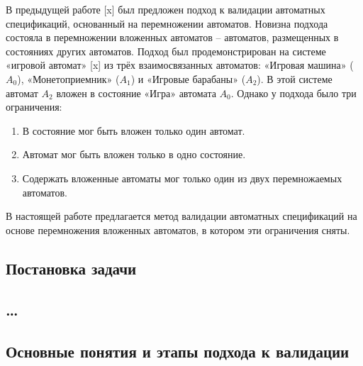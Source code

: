 \documentclass[12pt]{article}
\begin{document}
В предыдущей работе [x] был предложен подход к валидации автоматных спецификаций, основанный на перемножении автоматов. Новизна подхода состояла в перемножении вложенных автоматов – автоматов, размещенных в состояниях других автоматов. Подход был продемонстрирован на системе «игровой автомат» [x] из трёх взаимосвязанных автоматов: «Игровая машина» ($A_{0}$), «Монетоприемник» ($A_{1}$) и «Игровые барабаны» ($A_{2}$). В этой системе автомат $A_{2}$ вложен в состояние «Игра» автомата $A_{0}$. Однако у подхода было три ограничения:

\begin{enumerate}
\item В состояние мог быть вложен только один автомат.
\item Автомат мог быть вложен только в одно состояние.
\item Содержать вложенные автоматы мог только один из двух перемножаемых автоматов.
\end{enumerate}

В настоящей работе предлагается метод валидации автоматных спецификаций на основе перемножения вложенных автоматов, в котором эти ограничения сняты.

\subsection*{Постановка задачи}

\subsection*{…}

\subsection*{Основные понятия и этапы подхода к валидации}
\end{document}
